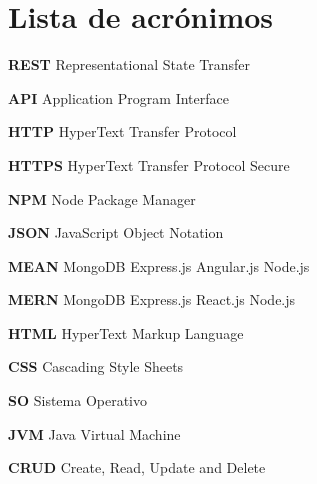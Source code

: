 \section{Lista de acrónimos}

\noindent \textbf{REST} Representational State Transfer \newline \smallskip

\noindent \textbf{API} Application Program Interface \newline \smallskip 

\noindent \textbf{HTTP} HyperText Transfer Protocol \newline \smallskip

\noindent \textbf{HTTPS} HyperText Transfer Protocol Secure \newline \smallskip

\noindent \textbf{NPM} Node Package Manager \newline \smallskip

\noindent \textbf{JSON} JavaScript Object Notation \newline \smallskip

\noindent \textbf{MEAN} MongoDB Express.js Angular.js Node.js \newline \smallskip 

\noindent \textbf{MERN} MongoDB Express.js React.js Node.js \newline \smallskip

\noindent \textbf{HTML} HyperText Markup Language \newline \smallskip

\noindent \textbf{CSS} Cascading Style Sheets \newline \smallskip

\noindent \textbf{SO} Sistema Operativo \newline \smallskip

\noindent \textbf{JVM} Java Virtual Machine \newline \smallskip

\noindent \textbf{CRUD} Create, Read, Update and Delete \newline \smallskip